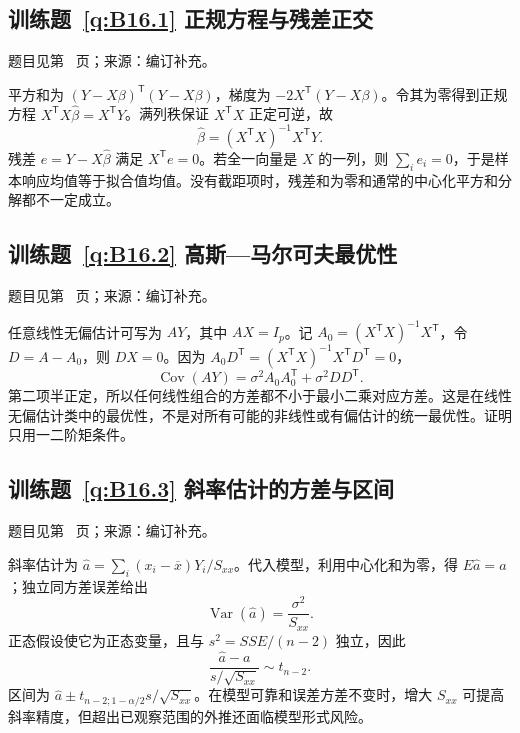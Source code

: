 \documentclass[UTF8,12pt,a4paper,fontset=fandol]{ctexbook}
\begin{document}
\subsection*{训练题~\ref{q:B16.1} 正规方程与残差正交}\label{a:B16.1}{\small 题目见第~\pageref{q:B16.1} 页；来源：编订补充。}
\begin{solve}平方和为 $(Y-X\beta)^\mathsf T(Y-X\beta)$，梯度为 $-2X^\mathsf T(Y-X\beta)$。令其为零得到正规方程 $X^\mathsf TX\widehat\beta=X^\mathsf TY$。满列秩保证 $X^\mathsf TX$ 正定可逆，故\[\widehat\beta=(X^\mathsf TX)^{-1}X^\mathsf TY.\]残差 $e=Y-X\widehat\beta$ 满足 $X^\mathsf Te=0$。若全一向量是 $X$ 的一列，则 $\sum_ie_i=0$，于是样本响应均值等于拟合值均值。没有截距项时，残差和为零和通常的中心化平方和分解都不一定成立。\end{solve}

\subsection*{训练题~\ref{q:B16.2} 高斯—马尔可夫最优性}\label{a:B16.2}{\small 题目见第~\pageref{q:B16.2} 页；来源：编订补充。}
\begin{solve}任意线性无偏估计可写为 $AY$，其中 $AX=I_p$。记 $A_0=(X^\mathsf TX)^{-1}X^\mathsf T$，令 $D=A-A_0$，则 $DX=0$。因为 $A_0D^\mathsf T=(X^\mathsf TX)^{-1}X^\mathsf TD^\mathsf T=0$，\[\operatorname{Cov}(AY)=\sigma^2A_0A_0^\mathsf T+\sigma^2DD^\mathsf T.\]第二项半正定，所以任何线性组合的方差都不小于最小二乘对应方差。这是在线性无偏估计类中的最优性，不是对所有可能的非线性或有偏估计的统一最优性。证明只用一二阶矩条件。\end{solve}

\subsection*{训练题~\ref{q:B16.3} 斜率估计的方差与区间}\label{a:B16.3}{\small 题目见第~\pageref{q:B16.3} 页；来源：编订补充。}
\begin{solve}斜率估计为 $\widehat a=\sum_i(x_i-\overline x)Y_i/S_{xx}$。代入模型，利用中心化和为零，得 $E\widehat a=a$；独立同方差误差给出\[\operatorname{Var}(\widehat a)=\frac{\sigma^2}{S_{xx}}.\]正态假设使它为正态变量，且与 $s^2=SSE/(n-2)$ 独立，因此\[\frac{\widehat a-a}{s/\sqrt{S_{xx}}}\sim t_{n-2}.\]区间为 $\widehat a\pm t_{n-2;1-\alpha/2}s/\sqrt{S_{xx}}$。在模型可靠和误差方差不变时，增大 $S_{xx}$ 可提高斜率精度，但超出已观察范围的外推还面临模型形式风险。\end{solve}
\end{document}
